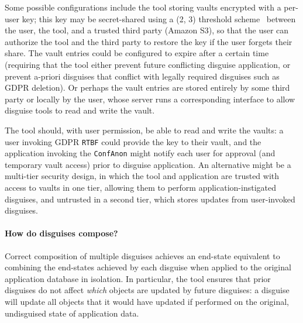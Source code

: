 %
Some possible configurations include the tool storing vaults encrypted with a per-user key; this key
may be secret-shared using a (2, 3) threshold scheme~\cite{secretsharing} between the user, the
tool, and a trusted third party (\eg Amazon S3), so that the user can authorize the tool and the
third party to restore the key if the user forgets their share. 
%
The vault entries could be configured to expire after a certain time (requiring that the tool either
prevent future conflicting disguise application, or prevent a-priori disguises that conflict with
legally required disguises such as GDPR deletion). 
%
Or perhaps the vault entries are stored entirely by some third party or locally by the user, whose
server runs a corresponding interface to allow disguise tools to read and write the vault.

The tool should, with user permission, be able to read and write the vaults: a user invoking GDPR
\texttt{RTBF} could provide the key to their vault, and the application invoking the
\texttt{ConfAnon} might notify each user for approval (and temporary vault access) prior to disguise
application. An alternative might be a multi-tier security design, in which the tool and application
are trusted with access to vaults in one tier, allowing them to perform application-instigated
disguises, and untrusted in a second tier, which stores updates from user-invoked disguises.


\paragraph{How do disguises compose?}
Correct composition of multiple disguises achieves an end-state equivalent to combining the
end-states achieved by each disguise when applied to the original application database in isolation.
%
In particular, the tool ensures that prior disguises do not affect \emph{which} objects are updated
by future disguises: a disguise will update all objects that it would have updated if performed on
the original, undisguised state of application data. 

